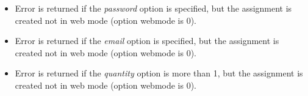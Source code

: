 \errheader
\begin{itemize}
    \item Error  is returned if the \textit{password} option is
    specified, but the assignment is created not in web mode (option webmode is
    0).

    \item Error  is returned if the \textit{email} option is
    specified, but the assignment is created not in web mode (option webmode is
    0).

    \item Error  is returned if the \textit{quantity} option is
    more than 1, but the assignment is created not in web mode (option webmode is
    0).
\end{itemize}
